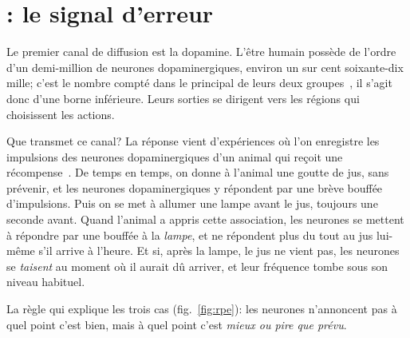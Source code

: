\section{: le signal d'erreur}

Le premier canal de diffusion est la dopamine. L'être humain possède de l'ordre d'un demi-million de neurones dopaminergiques, environ un sur cent soixante-dix mille; c'est le nombre compté dans le principal de leurs deux groupes~\cite{Pakkenberg1991}, il s'agit donc d'une borne inférieure. Leurs sorties se dirigent vers les régions qui choisissent les actions.

Que transmet ce canal? La réponse vient d'expériences où l'on enregistre les impulsions des neurones dopaminergiques d'un animal qui reçoit une récompense~\cite{Schultz1997}. De temps en temps, on donne à l'animal une goutte de jus, sans prévenir, et les neurones dopaminergiques y répondent par une brève bouffée d'impulsions. Puis on se met à allumer une lampe avant le jus, toujours une seconde avant. Quand l'animal a appris cette association, les neurones se mettent à répondre par une bouffée à la \emph{lampe}, et ne répondent plus du tout au jus lui-même s'il arrive à l'heure. Et si, après la lampe, le jus ne vient pas, les neurones se \emph{taisent} au moment où il aurait dû arriver, et leur fréquence tombe sous son niveau habituel.

La règle qui explique les trois cas (fig.~\ref{fig:rpe}): les neurones n'annoncent pas à quel point c'est bien, mais à quel point c'est \emph{mieux ou pire que prévu}.

